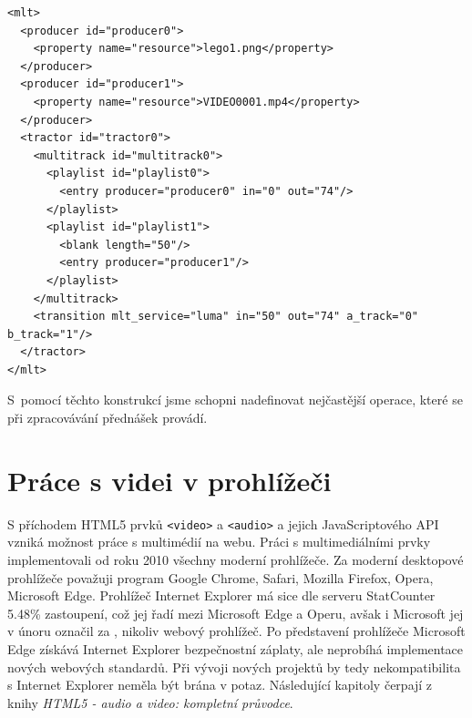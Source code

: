 \begin{lstlisting}[style=xml]
<mlt>
  <producer id="producer0">
    <property name="resource">lego1.png</property>
  </producer>
  <producer id="producer1">
    <property name="resource">VIDEO0001.mp4</property>
  </producer>
  <tractor id="tractor0">
    <multitrack id="multitrack0">
      <playlist id="playlist0">
        <entry producer="producer0" in="0" out="74"/>
      </playlist>
      <playlist id="playlist1">
        <blank length="50"/>
        <entry producer="producer1"/>
      </playlist>
    </multitrack>
    <transition mlt_service="luma" in="50" out="74" a_track="0" b_track="1"/>
  </tractor>
</mlt>
\end{lstlisting}

S~pomocí těchto konstrukcí jsme schopni nadefinovat nejčastější operace, které se při zpracovávání přednášek provádí.

\section{Práce s videi v prohlížeči}
S příchodem HTML5 prvků \texttt{<video>} a \texttt{<audio>} a jejich JavaScriptového API vzniká možnost práce s multimédií na webu. Práci s multimediálními prvky implementovali od roku 2010 všechny moderní prohlížeče. Za moderní desktopové prohlížeče považuji program Google Chrome, Safari, Mozilla Firefox, Opera, Microsoft Edge. Prohlížeč Internet Explorer má sice dle serveru StatCounter 5.48\% zastoupení, což jej řadí mezi Microsoft Edge a Operu\cite{statcounter}, avšak i Microsoft jej v únoru označil za , nikoliv webový prohlížeč.\cite{internetExplorer} Po představení prohlížeče Microsoft Edge získává Internet Explorer bezpečnostní záplaty, ale neprobíhá implementace nových webových standardů. Při vývoji nových projektů by tedy nekompatibilita s Internet Explorer neměla být brána v potaz. Následující kapitoly čerpají z knihy \textit{HTML5 - audio a video: kompletní průvodce}. \cite{HTML5multimedia}

